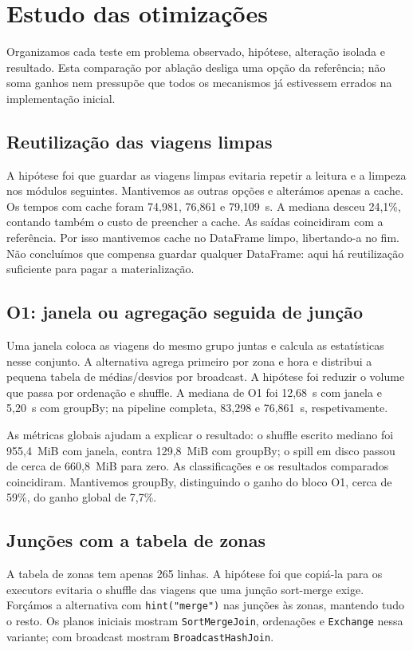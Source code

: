 \documentclass[sigconf]{acmart}
\begin{document}
\section{Estudo das otimizações}
Organizamos cada teste em problema observado, hipótese, alteração
isolada e resultado. Esta comparação por ablação desliga uma opção
da referência; não soma ganhos nem pressupõe que todos os mecanismos
já estivessem errados na implementação inicial.

\subsection{Reutilização das viagens limpas}
A hipótese foi que guardar as viagens limpas evitaria repetir a
leitura e a limpeza nos módulos seguintes. Mantivemos as outras
opções e alterámos apenas a cache. Os tempos com cache foram
74,981, 76,861 e 79,109~s. A mediana desceu 24,1\%, contando também
o custo de preencher a cache. As saídas coincidiram com a referência.
Por isso mantivemos cache no DataFrame limpo, libertando-a no fim.
Não concluímos que compensa guardar qualquer DataFrame: aqui há
reutilização suficiente para pagar a materialização.

\subsection{O1: janela ou agregação seguida de junção}
Uma janela coloca as viagens do mesmo grupo juntas e calcula as
estatísticas nesse conjunto. A alternativa agrega primeiro por zona
e hora e distribui a pequena tabela de médias/desvios por broadcast.
A hipótese foi reduzir o volume que passa por ordenação e shuffle.
A mediana de O1 foi 12,68~s com janela e 5,20~s com groupBy;
na pipeline completa, 83,298 e 76,861~s, respetivamente.

As métricas globais ajudam a explicar o resultado: o shuffle escrito
mediano foi 955,4~MiB com janela, contra 129,8~MiB com groupBy;
o spill em disco passou de cerca de 660,8~MiB para zero.
As classificações e os resultados comparados coincidiram.
Mantivemos groupBy, distinguindo o ganho do bloco O1, cerca de
59\%, do ganho global de 7,7\%.

\subsection{Junções com a tabela de zonas}
A tabela de zonas tem apenas 265 linhas. A hipótese foi que copiá-la
para os executors evitaria o shuffle das viagens que uma junção
sort-merge exige. Forçámos a alternativa com \texttt{hint("merge")}
nas junções às zonas, mantendo tudo o resto. Os planos iniciais
mostram \texttt{SortMergeJoin}, ordenações e \texttt{Exchange} nessa
variante; com broadcast mostram \texttt{BroadcastHashJoin}.
\end{document}
